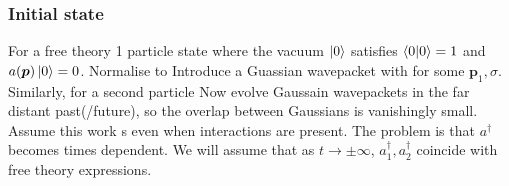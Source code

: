 \documentclass{article}
\begin{document}
\subsubsection*{Initial state}
For a free theory 1 particle state 
where the vacuum $\ket{0}$ satisfies $\braket{0|0}=1$ and $a(\bm{p})\ket{0}=0$. Normalise to 
Introduce a Guassian wavepacket 
with 
for some $\bm{p}_1,\sigma$. 
Similarly, for a second particle 
Now evolve Gaussain wavepackets in the far distant past(/future), so the overlap between Gaussians is vanishingly small. Assume this work s even when interactions are present. The problem is that $a^\dagger$ becomes times dependent. We will assume that as $t\to \pm\infty$, $a_1^\dagger,a_2^\dagger$ coincide with free theory expressions.
\end{document}
